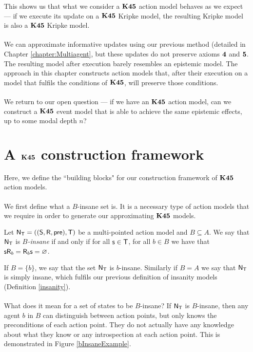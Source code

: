 This shows us that what we consider a $\bf K45$ action model behaves as we expect --- if we execute
its update on a $\bf K45$ Kripke model, the resulting Kripke model is also a $\bf K45$ Kripke model.\\
\\
We can approximate informative updates using our previous method (detailed in Chapter
\ref{chapter:Multiagent}, but these updates do not preserve
axioms $\bf 4$ and $\bf 5$.
The resulting model after execution barely resembles an epistemic model.
The approach in this chapter constructs action models that, after their execution on a model that
fulfils the conditions of $\bf K45$, will preserve those conditions.\\
\\
We return to our open question --- if we have an $\bf K45$ action model, can we construct a $\bf K45$ event
model that is able to achieve the same epistemic effects, up to some modal depth $n$?

\section{A $\bf K45$ construction framework} \label{subsec:k45:techPrelims}

Here, we define the ``building blocks" for our construction framework of $\bf K45$ action models.\\
\\
We first define what a $B$-insane set is.
It is a necessary type of action models that we require in order to generate our approximating $\bf K45$ models.

\begin{defn} \label{binsane}
	Let $\mathrm{\mathsf{N}}_\mathrm{\mathsf{T}} = ((\mathrm{\mathsf{S}}, \mathrm{\mathsf{R}}, \mathrm{\mathsf{pre}}), \mathrm{\mathsf{T}})$ be a multi-pointed action model and $B \subseteq A$.
	We say that $\mathrm{\mathsf{N}}_\mathrm{\mathsf{T}}$ is {\em $B$-insane} if and only if for all $\mathrm{\mathsf{s}} \in \mathrm{\mathsf{T}}$,
	for all $b \in B$ we have that $\mathrm{\mathsf{s}} \mathrm{\mathsf{R}}_b = \mathrm{\mathsf{R}}_b \mathrm{\mathsf{s}} = \varnothing$.
\end{defn}

If $B = \{b\}$, we say that the set $\mathrm{\mathsf{N}}_\mathrm{\mathsf{T}}$ is $b$-insane.
Similarly if $B = A$ we say that $\mathrm{\mathsf{N}}_\mathrm{\mathsf{T}}$ is simply insane, which fulfils
our previous definition of insanity models (Definition \ref{insanity}).\\
\\
What does it mean for a set of states to be $B$-insane?
If $\mathrm{\mathsf{N}}_\mathrm{\mathsf{T}}$ is $B$-insane, then any agent $b$ in $B$ can distinguish between
action points, but only knows the preconditions of each action point.
They do not actually have any knowledge about what they know or any
introspection at each action point.
This is demonstrated in Figure \ref{bInsaneExample}.

